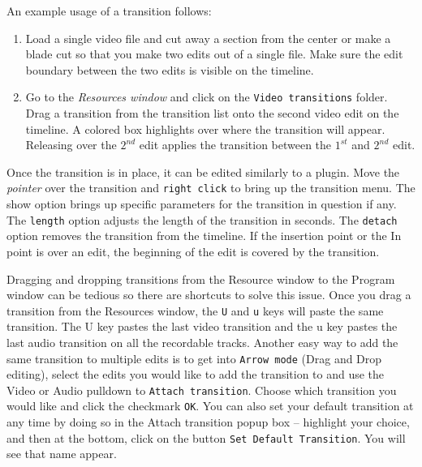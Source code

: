 An example usage of a transition follows:
\begin{enumerate}
    \item Load a single video file and cut away a section from the center or make a blade cut so that you make two edits out of a single file. Make sure the edit boundary between the two edits is visible on the timeline.
    \item Go to the \textit{Resources window} and click on the \texttt{Video transitions} folder. Drag a transition from the transition list onto the second video edit on the timeline. A colored box highlights over where the transition will appear. Releasing over the $2^{nd}$ edit applies the transition between the $1^{st}$ and $2^{nd}$ edit.
\end{enumerate}
Once the transition is in place, it can be edited similarly to a plugin. Move the \textit{pointer} over the transition and \texttt{right click} to bring up the transition menu. The show option brings up specific parameters for the transition in question if any. The \texttt{length} option adjusts the length of the transition in seconds. The \texttt{detach} option removes the transition from the timeline. If the insertion point or the In point is over an edit, the beginning of the edit is covered by the transition.

Dragging and dropping transitions from the Resource window to the Program window can be tedious so there are shortcuts to solve this issue. Once you drag a transition from the Resources window, the \texttt{U} and \texttt{u} keys will paste the same transition. The U key pastes the last video transition and the u key pastes the last audio transition on all the recordable tracks. Another easy way to add the same transition to multiple edits is to get into \texttt{Arrow mode} (Drag and Drop editing), select the edits you would like to add the transition to and use the Video or Audio pulldown to \texttt{Attach transition}. Choose which transition you would like and click the checkmark \texttt{OK}. You can also set your default transition at any time by doing so in the Attach transition popup box – highlight your choice, and then at the bottom, click on the button \texttt{Set Default Transition}. You will see that name appear.

